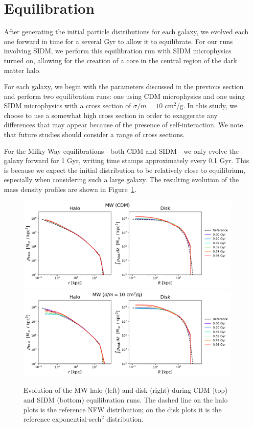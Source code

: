 \hypertarget{equilibration}{%
\section{Equilibration}\label{equilibration}}

After generating the initial particle distributions for each galaxy, we
evolved each one forward in time for a several Gyr to allow it to equilibrate.
For our runs involving SIDM, we perform this equilibration run with SIDM
microphysics turned on, allowing for the creation of a core in the central
region of the dark matter halo.

For each galaxy, we begin with the parameters discussed in the previous
section and perform two equilibration runs: one using CDM microphysics and one
using SIDM microphysics with a cross section of \(\sigma / m = 10\)
cm\(^2\)/g. In this study, we choose to use a somewhat high cross section in
order to exaggerate any differences that may appear because of the presence of
self-interaction. We note that future studies should consider a range of cross
sections.

For the Milky Way equilibrations---both CDM and SIDM---we only evolve the
galaxy forward for 1 Gyr, writing time stamps approximately every 0.1 Gyr.
This is because we expect the initial distribution to be relatively close to
equilibrium, especially when considering such a large galaxy. The resulting
evolution of the mass density profiles are shown in Figure~\ref{fig:mw_evo}.

\begin{figure}
    \centering
    \includegraphics[width=0.9\linewidth]{figs/mw_evolution_cdm.pdf}
    \includegraphics[width=0.9\linewidth]{figs/mw_evolution_sidm.pdf}
    \caption{%
        Evolution of the MW halo (left) and disk (right) during CDM (top) and
        SIDM (bottom) equilibration runs. The dashed line on the halo plots is
        the reference NFW distribution; on the disk plots it is the reference
        exponential-sech$^2$ distribution.
    }
    \label{fig:mw_evo}
\end{figure}

